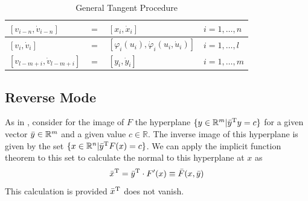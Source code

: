 \documentclass{article}
\begin{document}
\begin{table}[h]
    \centering
    \begin{tabular}{|lcll|}
        \hline
        $[v_{i-n}, \Dot{v}_{i-n}]$ & $=$ & $[x_{i}, \Dot{x}_{i}]$ & $i = 1, \ldots, n$ \\
        \hline
        $[v_{i}, \Dot{v}_{i}]$ & $=$ & $[\varphi_i (u_i), \Dot{\varphi}_i(u_i, \Dot{u}_i)]$ & $i = 1, \ldots, l$ \\
        \hline
        $[v_{l-m+i}, \Dot{v}_{l-m+i}]$ & $=$ & $[y_{i}, \Dot{y}_{i}]$ & $i = 1, \ldots, m$ \\
        \hline
    \end{tabular}
    \caption{General Tangent Procedure}
    \label{tab:gtp}
\end{table}

\subsection{Reverse Mode}

As in \cite{dhamarticle}, consider for the image of $F$ the hyperplane $\{ y \in \mathbb{R}^m | \Bar{y}^\text{T} y = c\}$ for a given vector $\Bar{y} \in \mathbb{R}^m$ and a given value $c \in \mathbb{R}$. The inverse image of this hyperplane is given by the set $\{ x \in \mathbb{R}^n | \Bar{y}^\text{T} F(x) = c\}$. We can apply the implicit function theorem to this set to calculate the normal to this hyperplane at $x$ as
\begin{equation}
    \Bar{x}^\text{T} = \Bar{y}^\text{T} \cdot F'(x) \equiv \Bar{F}(x, \Bar{y})
\end{equation}
This calculation is provided $\Bar{x}^\text{T}$ does not vanish.
\end{document}

